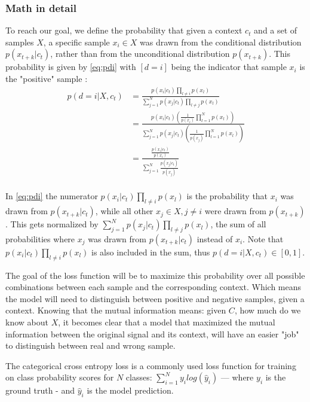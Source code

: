 \subsubsection{Math in detail}
To reach our goal, we define the probability that given a context $c_t$ and a set of samples $X$, a specific sample $x_i \in X$ was drawn from the conditional distribution $p(x_{t+k}|c_t)$, rather than from the unconditional distribution $p(x_{t+k})$.
This probability is given by \autoref{eq:pdi} with $[d = i]$ being the indicator that sample $x_i$ is the "positive" sample \autocite[4]{DBLP:journals/corr/abs-1807-03748}:
\begin{equation}
	\begin{aligned}
		p(d=i|X, c_t) &= \frac{p(x_i|c_t)\prod_{l\neq i}p(x_l)}{\sum_{j=1}^{N}p(x_j|c_t)\prod_{l\neq j}p(x_l)} \label{eq:pdi}\\
		&=\frac{p(x_i|c_t)\left(\frac{1}{p(x_i)}\prod_{l=1}^{N}p(x_l)\right)}{\sum_{j=1}^{N}p(x_j|c_t)\left(\frac{1}{p(x_j)}\prod_{l=1}^{N}p(x_l)\right)}\\
		&=\frac{\frac{p(x_i|c_t)}{p(x_i)}}{\sum_{j=1}^{N}\frac{p(x_j|c_t)}{p(x_j)}}\\ 
	\end{aligned}%
\end{equation}


In \autoref{eq:pdi} the numerator $p(x_i|c_t)\prod_{l\neq i}p(x_l)$ is the probability that $x_i$ was drawn from $p(x_{t+k}|c_t)$, while all other $x_{j}\in X, j\neq i$ were drawn from $p(x_{t+k})$. This gets normalized by $\sum_{j=1}^{N}p(x_j|c_t)\prod_{l\neq j}p(x_l)$, the sum of all probabilities where $x_j$ was drawn from $p(x_{t+k}|c_t)$ instead of $x_i$. Note that $p(x_i|c_t)\prod_{l\neq i}p(x_l)$ is also included in the sum, thus $p(d=i|X, c_t) \in [0,1]$.

The goal of the loss function will be to maximize this probability over all possible combinations between each sample and the corresponding context. Which means the model will need to distinguish between positive and negative samples, given a context. Knowing that the mutual information means: given $C$, how much do we know about $X$, it becomes clear that a model that maximized the mutual information between the original signal and its context, will have an easier "job" to distinguish between real and wrong sample.

The categorical cross entropy loss is a commonly used loss function for training on class probability scores for $N$ classes:
$\sum_{i=1}^{N}y_ilog(\hat{y}_i)$ --- where $y_i$ is the ground truth - and $\hat{y}_i$ is the model prediction.

